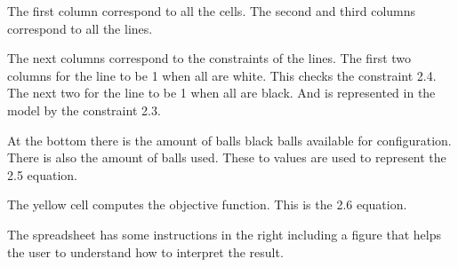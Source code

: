 \documentclass[12pt,a4paper]{report}
\begin{document}
The first column correspond to all the cells. The second and third columns correspond to
all the lines.

The next columns correspond to the constraints of the lines. The first two columns
for the line to be 1 when all are white. This checks the constraint 2.4. The next two for the line to be 1 when all are black. And is represented in the model by the constraint 2.3.

At the bottom there is the amount of balls black balls available for configuration. There is also the amount of balls used. These to values are used to represent the 2.5 equation.

The yellow cell computes the objective function. This is the 2.6 equation.

The spreadsheet has some instructions in the right including a figure that helps the user to understand how to interpret the result.
\end{document}
